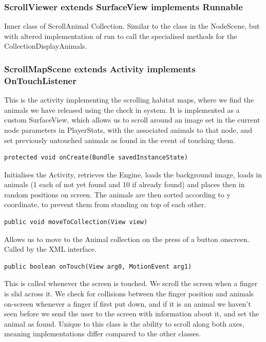 \documentclass[12pt,a4paper,twoside]{article}
\begin{document}
\subsubsection{ScrollViewer extends SurfaceView implements Runnable}

Inner class of ScrollAnimal Collection. Similar to the class in the NodeScene, but with altered implementation of run to call the specialised methods for the CollectionDisplayAnimals.


\subsubsection{ScrollMapScene extends Activity implements OnTouchListener}

This is the activity implementing the scrolling habitat maps, where we find the animals we have released using the check in system. It is implemented as a custom SurfaceView, which allows us to scroll around an image set in the current node parameters in PlayerStats, with the associated animals to that node, and set previously untouched animals as found in the event of touching them.

\begin{verbatim}
protected void onCreate(Bundle savedInstanceState)
\end{verbatim}

Initialises the Activity, retrieves the Engine, loads the background image, loads in animals (1 each of not yet found and 10 if already found) and places then in random positions on screen. The animals are then sorted according to y coordinate, to prevent them from standing on top of each other.

\begin{verbatim}
public void moveToCollection(View view)
\end{verbatim}
Allows us to move to the Animal collection on the press of a button onscreen. Called by the XML interface.

\begin{verbatim}
public boolean onTouch(View arg0, MotionEvent arg1)
\end{verbatim}

This is called whenever the screen is touched. We scroll the screen when a finger is slid across it. We check for collisions between the finger position and animals on-screen whenever a finger if first put down, and if it is an animal we haven't seen before we send the user to the screen with information about it, and set the animal as found. Unique to this class is the ability to scroll along both axes, meaning implementations differ compared to the other classes.
\end{document}
